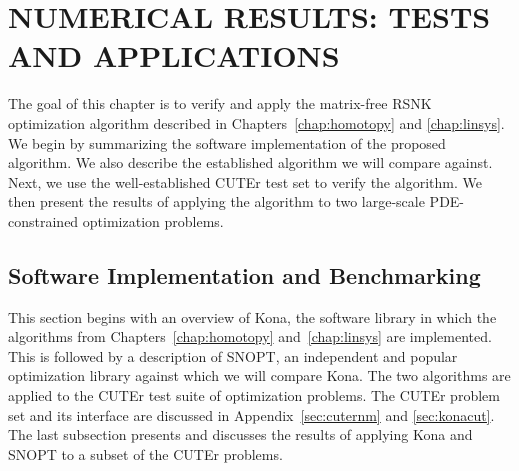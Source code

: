  
\chapter{NUMERICAL RESULTS: TESTS AND APPLICATIONS}
The goal of this chapter is to verify and apply the matrix-free RSNK optimization algorithm described in Chapters~\ref{chap:homotopy} and \ref{chap:linsys}.   We begin by summarizing the software implementation of the proposed algorithm.  We also describe the established algorithm we will compare against.  Next, we use the well-established CUTEr test set to verify the algorithm.  We then present the results of applying the algorithm to two large-scale PDE-constrained optimization problems.

\section{Software Implementation and Benchmarking}

This section begins with an overview of Kona, the software library in which the algorithms from Chapters~\ref{chap:homotopy} and~\ref{chap:linsys} are implemented.  This is followed by a description of SNOPT, an independent and popular optimization library against which we will compare Kona. The two algorithms are applied to the CUTEr test suite of optimization problems.  The CUTEr problem set and its interface are discussed in Appendix~\ref{sec:cuternm} and \ref{sec:konacut}.  The last subsection presents and discusses the results of applying Kona and SNOPT to a subset of the CUTEr problems. 

